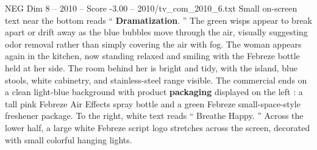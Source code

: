 \begin{textsample}{NEG Dim 8 – 2010 – Score -3.00 – 2010/tv\_com\_2010\_6.txt}
Small on-screen text near the bottom reads “ \textbf{Dramatization}. ” The green wisps appear to break apart or drift away as the blue bubbles move through the air, visually suggesting odor removal rather than simply covering the air with fog.
The woman appears again in the kitchen, now standing relaxed and smiling with the Febreze bottle held at her side.
The room behind her is bright and tidy, with the island, blue stools, white cabinetry, and stainless-steel range visible.
The commercial ends on a clean light-blue background with product \textbf{packaging} displayed on the left : a tall pink Febreze Air Effects spray bottle and a green Febreze small-space-style freshener package.
To the right, white text reads “ Breathe Happy. ” Across the lower half, a large white Febreze script logo stretches across the screen, decorated with small colorful hanging lights.

\end{textsample}
